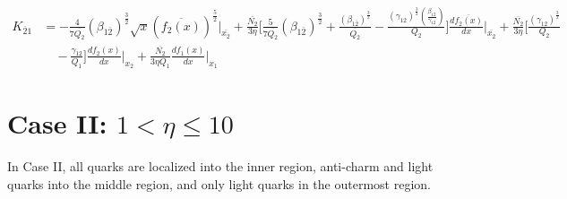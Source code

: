 \documentclass[fleqn, 10pt]{article}
\begin{document}
                    \begin{equation}
                   \begin{split}
                       K_{\overline{2}1}  &= -   \frac{4}{7\overline{Q_2}} (\beta_{1\overline{2}})^\frac{3}{2} \sqrt{x} (\overline{f_2(x)})^\frac{5}{2} \Bigg|_{\overline{x_2}} + \frac{\overline{N_2}}{3 \eta} \Biggl[ \frac{5}{7 \overline{Q_2}} (\beta_{1\overline{2}})^\frac{3}{2}+   \frac{(\beta_{1\overline{2}})^\frac{3}{2}}{\overline{Q_2}} - \frac{(\gamma_{12})^\frac{3}{2} \left(\frac{\beta_{1\overline{2}}}{\gamma_{12}}\right)}{Q_{2}} \Biggr] \frac{d\overline{f_2(x)}}{dx}\Bigg|_{\overline{x_2}} +   \frac{\overline{N_2}}{3 \eta}  \Biggl[\frac{(\gamma_{12})^\frac{3}{2}}{Q_2} \\ & \quad -   \frac{\gamma_{12}}{Q_1} \Biggr] \frac{df_2(x)}{dx} \Bigg|_{x_2}  +   \frac{\overline{N_2}}{3 \eta Q_1} \frac{df_1(x)}{dx} \Bigg|_{x_1}
                         \label{66}
                         \end{split}
            \end{equation}
\section{Case II: $1 < \eta \leq 10$}
In Case II, all quarks are localized into the inner region, anti-charm and light quarks into the middle region, and only light quarks in the outermost region. 
\end{document}

